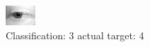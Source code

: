 \begin{figure}[h!]
\begin{center}
\includegraphics[width=0.60\columnwidth]{figures/ID2614_class_3_target_4.png}
\end{center}
\caption{ Classification: 3 actual target: 4}
\label{fig:ID2614_class_3_target_4}
\end{figure}
